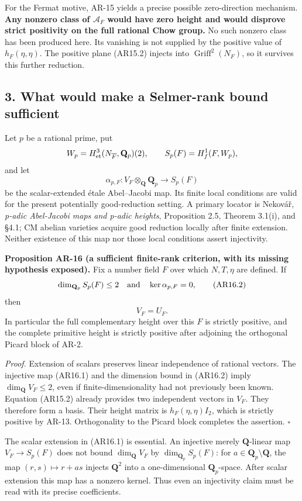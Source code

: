 \documentclass[11pt,a4paper]{article}
\begin{document}
For the Fermat motive, AR-15 yields a precise possible zero-direction
mechanism. \textbf{Any nonzero class of \(\mathcal A_F\) would have zero
height and would disprove strict positivity on the full rational Chow
group.} No such nonzero class has been produced here. Its vanishing is
not supplied by the positive value of \(h_F(\eta,\eta)\). The positive
plane (AR15.2) injects into \(\operatorname{Griff}^2(N_F)\), so it
survives this further reduction.

\subsection{3. What would make a Selmer-rank bound
sufficient}\label{what-would-make-a-selmer-rank-bound-sufficient}

Let \(p\) be a rational prime, put \[
W_p=H^3_{\rm et}(N_{\overline F},\mathbf Q_p)(2),
\qquad S_p(F)=H^1_f(F,W_p),
\] and let \[
\alpha_{p,F}:V_F\otimes_{\mathbf Q}\mathbf Q_p
             \longrightarrow S_p(F)
\tag{AR16.1}
\] be the scalar-extended étale Abel--Jacobi map. Its finite local
conditions are valid for the present potentially good-reduction setting.
A primary locator is Nekovář, \emph{p-adic Abel-Jacobi maps and p-adic
heights}, Proposition 2.5, Theorem 3.1(i), and §4.1; CM abelian
varieties acquire good reduction locally after finite extension. Neither
existence of this map nor those local conditions assert injectivity.

\textbf{Proposition AR-16 (a sufficient finite-rank criterion, with its
missing hypothesis exposed).} Fix a number field \(F\) over which
\(N,T,\eta\) are defined. If \[
\dim_{\mathbf Q_p}S_p(F)\le2
\quad\hbox{and}\quad
\ker\alpha_{p,F}=0,
\tag{AR16.2}
\] then \[
V_F=U_F.
\tag{AR16.3}
\] In particular the full complementary height over this \(F\) is
strictly positive, and the complete primitive height is strictly
positive after adjoining the orthogonal Picard block of AR-2.

\emph{Proof.} Extension of scalars preserves linear independence of
rational vectors. The injective map (AR16.1) and the dimension bound in
(AR16.2) imply \(\dim_{\mathbf Q}V_F\le2\), even if
finite-dimensionality had not previously been known. Equation (AR15.2)
already provides two independent vectors in \(V_F\). They therefore form
a basis. Their height matrix is \(h_F(\eta,\eta)I_2\), which is strictly
positive by AR-13. Orthogonality to the Picard block completes the
assertion. \(\square\)

The scalar extension in (AR16.1) is essential. An injective merely
\(\mathbf Q\)-linear map \(V_F\to S_p(F)\) does not bound
\(\dim_{\mathbf Q}V_F\) by \(\dim_{\mathbf Q_p}S_p(F)\): for
\(a\in\mathbf Q_p\setminus\mathbf Q\), the map \((r,s)\mapsto r+as\)
injects \(\mathbf Q^2\) into a one-dimensional \(\mathbf Q_p\)-space.
After scalar extension this map has a nonzero kernel. Thus even an
injectivity claim must be read with its precise coefficients.
\end{document}

